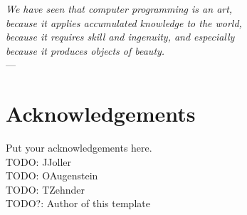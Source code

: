 

\begin{flushright}{\slshape
We have seen that computer programming is an art, \\ 
because it applies accumulated knowledge to the world, \\ 
because it requires skill and ingenuity, and especially \\
because it produces objects of beauty.} \\ \medskip
---  \citep{knuth:1974}
\end{flushright}

\bigskip


\begingroup

\let\clearpage\relax
\let\cleardoublepage\relax
\let\cleardoublepage\relax

\chapter*{Acknowledgements} %

Put your acknowledgements here.\\

\noindent TODO: JJoller \\

\noindent TODO: OAugenstein \\

\noindent TODO: TZehnder \\

\noindent TODO?: Author of this template \\

\endgroup

